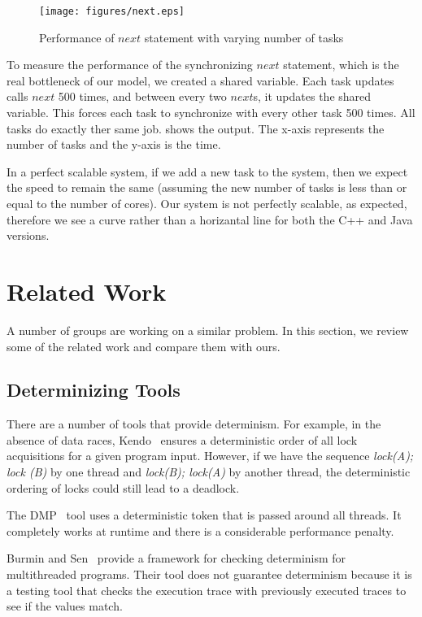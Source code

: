 \documentclass[10pt, conference, compsocconf]{IEEEtran}
\begin{document}
\begin{figure*}[htbp]
\texttt{[image: figures/next.eps]}
\caption{Performance of $next$ statement with varying number of tasks}
\label{fig:next}
\end{figure*}


To measure the performance of the synchronizing $next$ statement, which
is the real bottleneck of our model, we created a shared variable.
Each task updates calls $next$ 500 times, and between every two $next$s, it
updates the shared variable. This  forces
each task to synchronize with every other task 500 times.
All tasks do exactly ther same job.  shows the output.
The x-axis represents the number of tasks and the y-axis is the time.

In a perfect scalable system, if we add a new task to the system, then we 
expect the  speed to remain the same (assuming the new number of tasks is less 
than or equal to the number of cores). Our system is not perfectly scalable,
as expected, therefore we see a curve rather than a horizantal line for both
the C++ and Java versions.




\section{Related Work}
\label{sec:related}

A number of groups are working on a similar problem.
In this section, we review some of the related work
and compare them with ours.
 
\subsection{Determinizing Tools} 
 
There are a number of tools that provide determinism. For example, 
in the absence of data races, Kendo~\cite{olszewski2009kendo} ensures 
a deterministic order of all lock acquisitions for a given program input. 
However, if we have the sequence \emph{lock(A); lock (B)} by one thread 
and \emph{lock(B); lock(A)} by another thread, the deterministic ordering 
of locks could still lead to a deadlock. 
 
The DMP~\cite{devietti2009dmp} tool uses a deterministic token that is passed around all threads.  It completely works at runtime and there is a considerable performance penalty. 
 
Burmin and Sen~\cite{Burnim2009asserting} provide a framework for checking determinism for 
multithreaded programs. Their tool does not  
 guarantee determinism because it is a testing tool 
that checks the execution trace  with previously executed 
traces to see if the values match. 
\end{document}
